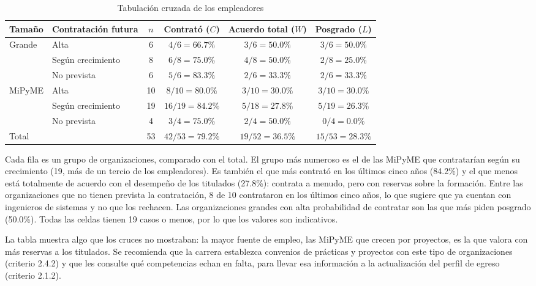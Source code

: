 \documentclass[12pt, a4paper]{article}
\newenvironment{mitabla}[2][H]{%
  \begin{table}[#1]
  \centering
  \caption{#2}
  \small
}{%
  \end{table}
}
\begin{document}
\begin{mitabla}{Tabulación cruzada de los empleadores}\label{tab:a5-multi}
\begin{tabular}{llcccc}
\toprule
\textbf{Tamaño} & \textbf{Contratación futura} & \textbf{$n$} & \textbf{Contrató ($C$)} & \textbf{Acuerdo total ($W$)} & \textbf{Posgrado ($L$)} \\
\midrule
Grande & Alta & 6 & $4/6 = 66.7\%$ & $3/6 = 50.0\%$ & $3/6 = 50.0\%$ \\
 & Según crecimiento & 8 & $6/8 = 75.0\%$ & $4/8 = 50.0\%$ & $2/8 = 25.0\%$ \\
 & No prevista & 6 & $5/6 = 83.3\%$ & $2/6 = 33.3\%$ & $2/6 = 33.3\%$ \\
MiPyME & Alta & 10 & $8/10 = 80.0\%$ & $3/10 = 30.0\%$ & $3/10 = 30.0\%$ \\
 & Según crecimiento & 19 & $16/19 = 84.2\%$ & $5/18 = 27.8\%$ & $5/19 = 26.3\%$ \\
 & No prevista & 4 & $3/4 = 75.0\%$ & $2/4 = 50.0\%$ & $0/4 = 0.0\%$ \\
\midrule
\multicolumn{2}{l}{Total} & 53 & $42/53 = 79.2\%$ & $19/52 = 36.5\%$ & $15/53 = 28.3\%$ \\
\bottomrule
\end{tabular}
\end{mitabla}

Cada fila es un grupo de organizaciones, comparado con el total. El
grupo más numeroso es el de las MiPyME que contratarían según su
crecimiento (19, más de un tercio de los empleadores). Es también el que
más contrató en los últimos cinco años (84.2\%) y el que menos está
totalmente de acuerdo con el desempeño de los titulados (27.8\%): contrata
a menudo, pero con reservas sobre la formación. Entre las organizaciones
que no tienen prevista la contratación, 8 de 10 contrataron en los
últimos cinco años, lo que sugiere que ya cuentan con ingenieros de
sistemas y no que los rechacen. Las organizaciones grandes con alta
probabilidad de contratar son las que más piden posgrado (50.0\%). Todas
las celdas tienen 19 casos o menos, por lo que los valores son
indicativos.

La tabla muestra algo que los cruces no mostraban: la mayor fuente de
empleo, las MiPyME que crecen por proyectos, es la que valora con más
reservas a los titulados. Se recomienda que la carrera establezca
convenios de prácticas y proyectos con este tipo de organizaciones
(criterio 2.4.2) y que les consulte qué competencias echan en falta, para
llevar esa información a la actualización del perfil de egreso (criterio
2.1.2).
\end{document}
